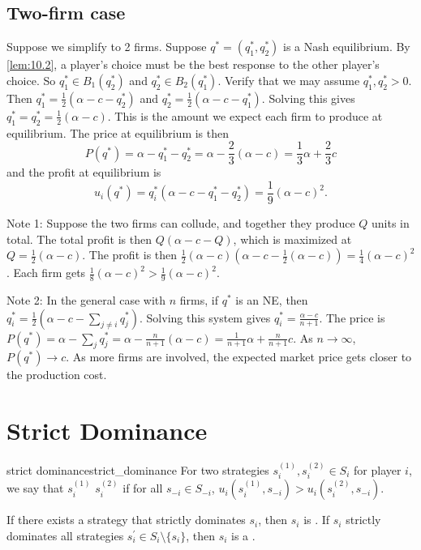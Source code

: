 \documentclass[12pt,letterpaper]{report}
\begin{document}
\subsection{Two-firm case}

Suppose we simplify to 2 firms.
Suppose $q^* = (q_1^*, q_2^*)$ is a Nash equilibrium.
By \cref{lem:10.2}, a player's choice must be the best response to the other player's choice.
So $q_1^* \in B_1(q_2^*)$ and $q_2^* \in B_2(q_1^*)$.
Verify that we may assume $q_1^*, q_2^* > 0$.
Then $q_1^* = \frac{1}{2}(\alpha - c - q_2^*)$ and $q_2^* = \frac{1}{2}(\alpha - c - q_1^*)$.
Solving this gives $q_1^* = q_2^* = \frac{1}{2}(\alpha - c)$.
This is the amount we expect each firm to produce at equilibrium.
The price at equilibrium is then
\[
  P(q^*) = \alpha - q_1^* - q_2^* = \alpha - \frac{2}{3}(\alpha - c)
    = \frac{1}{3}\alpha + \frac{2}{3}c
\]
and the profit at equilibrium is
\[
  u_i(q^*) = q_i^*(\alpha - c - q_1^* - q_2^*) = \frac{1}{9}(\alpha - c)^2.
\]

Note 1: Suppose the two firms can collude, and together they produce $Q$ units in total.
The total profit is then $Q(\alpha - c - Q)$, which is maximized at $Q = \frac{1}{2}(\alpha - c)$.
The profit is then
$\frac{1}{2}(\alpha - c)(\alpha - c - \frac{1}{2}(\alpha - c)) = \frac{1}{4}(\alpha - c)^2$.
Each firm gets $\frac{1}{8}(\alpha - c)^2 > \frac{1}{9}(\alpha - c)^2$.

Note 2: In the general case with $n$ firms, if $q^*$ is an NE, then
$q_i^* = \frac{1}{2}(\alpha - c - \sum_{j \neq i} q_j^*)$.
Solving this system gives $q_i^* = \frac{\alpha - c}{n + 1}$.
The price is $P(q^*) = \alpha - \sum_j q_j^* = \alpha - \frac{n}{n + 1}(\alpha - c)
  = \frac{1}{n + 1}\alpha + \frac{n}{n + 1}c$.
As $n \to \infty$, $P(q^*) \to c$.
As more firms are involved, the expected market price gets closer to the production cost.

\section{Strict Dominance}

\begin{defn}{strict dominance}{strict_dominance}
  For two strategies $s_i^{(1)}, s_i^{(2)} \in S_i$ for player $i$, we say that $s_i^{(1)}$
   $s_i^{(2)}$ if for all $s_{-i} \in S_{-i}$,
  $u_i(s_i^{(1)}, s_{-i}) > u_i(s_i^{(2)}, s_{-i})$.

  If there exists a strategy that strictly dominates $s_i$, then $s_i$ is
  .
  If $s_i$ strictly dominates all strategies $s_i^\prime \in S_i \setminus \{ s_i \}$, then $s_i$ is
  a .
\end{defn}
\end{document}
